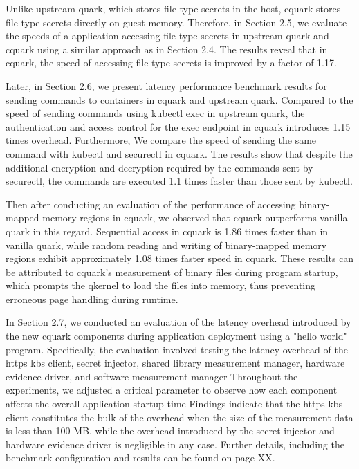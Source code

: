 Unlike upstream quark, which stores file-type secrets in the host, cquark stores file-type secrets directly on guest memory. Therefore, in Section 2.5, we evaluate the speeds of a application accessing file-type secrets in upstream quark and cquark using a similar approach as in Section 2.4. 
The results reveal that in cquark, the speed of accessing file-type secrets is improved by a factor of 1.17.


Later, in Section 2.6, we present latency performance benchmark results for sending commands to containers in cquark and upstream quark. Compared to the speed of sending commands using kubectl exec in upstream quark, the authentication and access control for the exec endpoint in cquark introduces 1.15 times overhead. Furthermore, We compare the speed of sending the same command with kubectl and securectl in cquark. The results show that despite the additional encryption and decryption required by the commands sent by securectl, the commands are executed 1.1 times faster than those sent by kubectl.

Then after conducting an evaluation of the performance of accessing binary-mapped memory regions in cquark, we observed that cquark outperforms vanilla quark in this regard. Sequential access in cquark is 1.86 times faster than in vanilla quark, while random reading and writing of binary-mapped memory regions exhibit approximately 1.08 times faster speed in cquark. These results can be attributed to cquark's measurement of binary files during program startup, which prompts the qkernel to load the files into memory, thus preventing erroneous page handling during runtime.

In Section 2.7, we conducted an evaluation of the latency overhead introduced by the new cquark components during application deployment using a "hello world" program.  Specifically, the evaluation involved testing the latency overhead of the https kbs client, secret injector, shared library measurement manager, hardware evidence driver, and software measurement manager Throughout the experiments, we adjusted a critical parameter to observe how each component affects the overall application startup time Findings indicate that the https kbs client constitutes the bulk of the overhead when the size of the measurement data is less than 100 MB, while the overhead introduced by the secret injector and hardware evidence driver is negligible in any case. Further details, including the benchmark configuration and results can be found on page XX.


